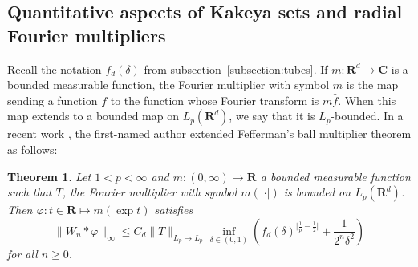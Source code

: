 \documentclass[10pt]{amsart}
\newcommand{\R}{\mathbf{R}}
\newcommand{\C}{\mathbf{C}}
\newtheorem{theorem}{Theorem}[section]
\begin{document}
\subsection{Quantitative aspects of Kakeya sets and radial Fourier multipliers}
Recall the notation $f_d(\delta)$ from  subsection~\ref{subsection:tubes}. If $m:\R^d \to \C$ is a bounded measurable function, the Fourier multiplier with symbol $m$ is the map sending a function $f$ to the function whose Fourier transform is $m \hat{f}$. When this map extends to a bounded map on $L_p(\R^d)$, we say that it is $L_p$-bounded. In a recent work \cite{delasalle2026kakeyaconjecturehighranklattice}, the first-named author extended Fefferman's ball multiplier theorem as follows:
\begin{theorem}\label{thm:regularity_Fourier_multipliers}\cite{delasalle2026kakeyaconjecturehighranklattice}
Let $1<p<\infty$ and $m:(0,\infty) \to \R$ a bounded measurable function such that $T$, the Fourier multiplier with symbol $m(|\cdot|)$ is bounded on $L_p(\R^d)$. Then $\varphi:t\in \R \mapsto m(\exp t)$ satisfies
  \[ \|W_n\ast \varphi\|_\infty \leq C_d \|T\|_{L_p \to L_p} \inf_{\delta \in (0,1)} \left(f_d(\delta)^{\big|\frac 1 p - \frac 1 2\big|} + \frac{1}{2^n \delta^2} \right)\]
for all $n \geq 0$.
\end{theorem}
\end{document}
